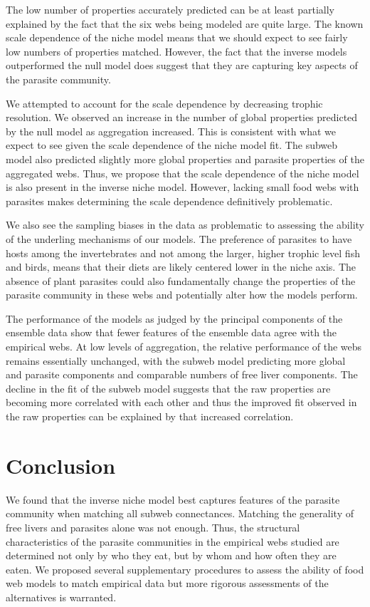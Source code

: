 \documentclass[/home/nkappler/Research/Dissertation/
 dissertation.tex]{subfiles}
\begin{document}
\begin{bibunit}
The low number of properties accurately predicted can be at least partially
explained by the fact that the six webs being modeled are quite large. The
known scale dependence of the niche model means that we should expect to see
fairly low numbers of properties matched. However, the fact that the inverse
models outperformed the null model does suggest that they are capturing key
aspects of the parasite community. 

We attempted to account for the scale dependence by decreasing trophic
resolution. We observed an increase in the number of global properties
predicted by the null model as aggregation increased. This is consistent with
what we expect to see given the scale dependence of the niche model fit. The
subweb model also predicted slightly more global properties and parasite
properties of the aggregated webs. Thus, we propose that the scale dependence
of the niche model is also present in the inverse niche model. However, lacking
small food webs with parasites makes determining the scale dependence
definitively problematic. 

We also see the sampling biases in the data as problematic to assessing the
ability of the underling mechanisms of our models. The preference of parasites
to have hosts among the invertebrates and not among the larger, higher trophic
level fish and birds, means that their diets are likely centered lower in the
niche axis. The absence of plant parasites could also fundamentally change the
properties of the parasite community in these webs and potentially alter how
the models perform.

The performance of the models as judged by the principal components of the
ensemble data show that fewer features of the ensemble data agree with the
empirical webs. At low levels of aggregation, the relative performance of the
webs remains essentially unchanged, with the subweb model predicting more
global and parasite components and comparable numbers of free liver components.
The decline in the fit of the subweb model suggests that the raw properties are
becoming more correlated with each other and thus the improved fit observed in
the raw properties can be explained by that increased correlation.

\section{Conclusion}

We found that the inverse niche model best captures features of the parasite
community when matching all subweb connectances. Matching the generality of
free livers and parasites alone was not enough. Thus, the structural
characteristics of the parasite communities in the empirical webs studied are
determined not only by who they eat, but by whom and how often they are eaten.
We proposed several supplementary procedures to assess the ability of food web
models to match empirical data but more rigorous assessments of the
alternatives is warranted.

\clearpage
{}
\putbib

\end{bibunit}
\end{document}
